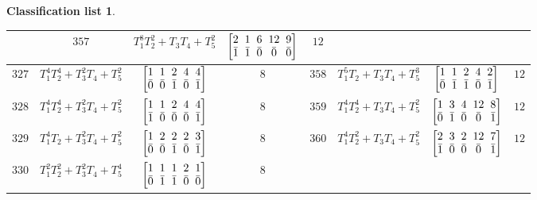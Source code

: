\documentclass[10pt,a4paper]{amsart}
\theoremstyle{definition}
\newtheorem{class-list}[thm]{Classification list}
\numberwithin{equation}{section}
\begin{document}
\begin{class-list}
\begin{table}[h!]
\begin{tabu}{c|c|c|c||c|c|c|c}
&${357}$&${T_{1}^{8}T_{2}^{2}+T_{3}T_{4}+T_{5}^{2}}$
&$\arraycolsep=1mm\begin{bmatrix}{2} & {1} & {6} & {12} & {9} \\ {\bar{1}} & {\bar{1}} & {\bar{0}} & {\bar{0}} & {\bar{0}}\end{bmatrix}$&${12}$
\\
\hline
${327}$&${T_{1}^{4}T_{2}^{4}+T_{3}^{2}T_{4}+T_{5}^{2}}$
&$\arraycolsep=1mm\begin{bmatrix}{1} & {1} & {2} & {4} & {4} \\ {\bar{0}} & {\bar{0}} & {\bar{1}} & {\bar{0}} & {\bar{1}}\end{bmatrix}$&${8}$
&${358}$&${T_{1}^{5}T_{2}+T_{3}T_{4}+T_{5}^{3}}$
&$\arraycolsep=1mm\begin{bmatrix}{1} & {1} & {2} & {4} & {2} \\ {\bar{0}} & {\bar{1}} & {\bar{1}} & {\bar{0}} & {\bar{1}}\end{bmatrix}$&${12}$
\\
\hline
${328}$&${T_{1}^{4}T_{2}^{4}+T_{3}^{2}T_{4}+T_{5}^{2}}$
&$\arraycolsep=1mm\begin{bmatrix}{1} & {1} & {2} & {4} & {4} \\ {\bar{1}} & {\bar{0}} & {\bar{0}} & {\bar{0}} & {\bar{1}}\end{bmatrix}$&${8}$
&${359}$&${T_{1}^{4}T_{2}^{4}+T_{3}T_{4}+T_{5}^{2}}$
&$\arraycolsep=1mm\begin{bmatrix}{1} & {3} & {4} & {12} & {8} \\ {\bar{0}} & {\bar{1}} & {\bar{0}} & {\bar{0}} & {\bar{1}}\end{bmatrix}$&${12}$
\\
\hline
${329}$&${T_{1}^{4}T_{2}+T_{3}^{2}T_{4}+T_{5}^{2}}$
&$\arraycolsep=1mm\begin{bmatrix}{1} & {2} & {2} & {2} & {3} \\ {\bar{0}} & {\bar{0}} & {\bar{1}} & {\bar{0}} & {\bar{1}}\end{bmatrix}$&${8}$
&${360}$&${T_{1}^{4}T_{2}^{2}+T_{3}T_{4}+T_{5}^{2}}$
&$\arraycolsep=1mm\begin{bmatrix}{2} & {3} & {2} & {12} & {7} \\ {\bar{1}} & {\bar{0}} & {\bar{0}} & {\bar{0}} & {\bar{1}}\end{bmatrix}$&${12}$
\\
\hline
${330}$&${T_{1}^{2}T_{2}^{2}+T_{3}^{2}T_{4}+T_{5}^{4}}$
&$\arraycolsep=1mm\begin{bmatrix}{1} & {1} & {1} & {2} & {1} \\ {\bar{0}} & {\bar{1}} & {\bar{1}} & {\bar{0}} & {\bar{0}}\end{bmatrix}$&${8}$

\end{tabu}
\end{table}
\end{class-list}
\end{document}
